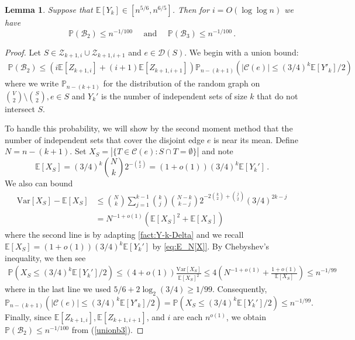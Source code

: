 \documentclass[11pt]{article}
\newtheorem{lemma}[theorem]{Lemma}
\theoremstyle{definition}
\theoremstyle{remark}
\newcommand{\cZ}{\mathcal{Z}}
\newcommand{\cY}{\mathcal{Y}}
\newcommand{\EE}{\mathbb{E}}
\newcommand{\E}{\mathbb{E}}
\newcommand{\PP}{\mathbb{P}}
\newcommand{\cC}{\mathcal{C}}
\newcommand{\cD}{\mathcal{D}}
\newcommand{\cB}{\mathcal{B}}
\begin{document}
\begin{lemma}\label{lem:large-covers}
    Suppose that $\E [Y_k] \in [n^{5/6},n^{6/5}]$.  Then for $i = O(\log\log n)$ we have 
    $$\PP(\cB_2 ) \leq  n^{-1/100}\quad \text{ and }\quad  \PP(\cB_3) \leq n^{-1/100}\,.$$
\end{lemma}
\begin{proof}
    Let $S \in \cZ_{k+1,i} \cup \cZ_{k+1, i+1}$ and $e \in \cD(S)$.  We begin with a union bound:  \begin{align} \label{unionb3}
        \PP(\cB_2) \leq (i \E[Z_{k+1,i}] + (i+1)\E[ Z_{k+1, i+1}]) \PP_{n-(k+1)}\left( |\cC(e)| \leq (3/4)^k \E[Y'_k] / 2 \right)
    \end{align}
   where we write $\PP_{n-(k+1)}$ for the distribution of the random graph on $ \binom{V}{2} \setminus \binom{S}{2}, e \in S$ and
   $ Y_k'$ is the number of independent sets of size $k$ that do not intersect $S$.
   
    
    To handle this probability, we will show by the second moment method that the number of independent sets that cover the disjoint edge $e$ is near its mean.  Define $N = n- (k +1)$.  Set $X_S = | \{ T \in \cC(e) : S \cap T = \emptyset\}|$ and note \begin{equation} \label{eq:E_N[X]}
        \E[ X_S] = (3/4)^k \binom{N}{k} 2^{-\binom{k}{2}} = (1 + o(1)) (3/4)^k \E [Y_k']\,.
    \end{equation}  We also can bound \begin{align*}
        \mathrm{Var}[X_S] - \E[X_S] &\le \binom{N}{k} \sum_{j = 1}^{k-1} \binom{k}{j} \binom{N - k}{k - j}2^{-2\binom{k}{2} + \binom{j}{2}} (3/4)^{2k-j} \\
        &= N^{-1 + o(1)} \left(\E[X_S]^2 + \E[X_S]\right)
    \end{align*}
    where the second line is by adapting \cref{fact:Y-k-Delta} and we recall $\E[X_S] = (1 + o(1))(3/4)^k \E[Y_k']$ by \eqref{eq:E_N[X]}.  By Chebyshev's inequality, we then see \begin{align*}
        \PP(X_S \leq (3/4)^k \E [Y_k'] / 2) \leq (4 + o(1))\frac{\mathrm{Var}[X_S]}{\E [X_S]^2} \leq  4 \left(N^{-1 + o(1)} + \frac{1 + o(1)}{\E[X_S]} \right) \leq n^{-1/99}
    \end{align*}
    where in the last line we used $5/6 + 2\log_2(3/4) \geq 1/99$. Consequently, 
   $$ \PP_{n-(k+1)}\left( |\cC(e)| \leq (3/4)^k \E[Y'_k] / 2 \right)=\PP(X_S \leq (3/4)^k \E [Y_k'] / 2) \leq n^{-1/99}.$$
   Finally, since $\EE[Z_{k+1, i}], \E[ Z_{k+1,i+1}]$, and $i$ are each $n^{o(1)}$, we obtain 
$\PP(\cB_2 ) \leq  n^{-1/100}$ from (\ref{unionb3}).
   

\end{proof}
\end{document}
